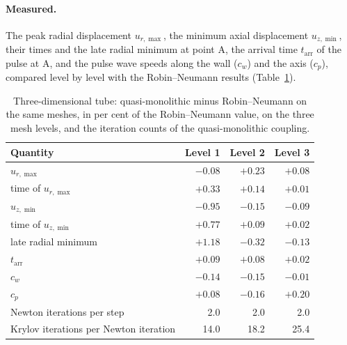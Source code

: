\paragraph{Measured.}
The peak radial displacement $u_{r,\max}$, the minimum axial displacement $u_{z,\min}$, their times and the late radial minimum at point A, the arrival time $t_\mathrm{arr}$ of the pulse at A, and the pulse wave speeds along the wall ($c_w$) and the axis ($c_p$), compared level by level with the Robin--Neumann results (Table~\ref{tab:tube3d_consistency}).

\begin{table}[htbp]
	\centering
	\caption{Three-dimensional tube: quasi-monolithic minus Robin--Neumann on the same meshes, in per cent of the Robin--Neumann value, on the three mesh levels, and the iteration counts of the quasi-monolithic coupling.}
	\label{tab:tube3d_consistency}
	\begin{tabular}{lrrr}
		\toprule
		Quantity & Level 1 & Level 2 & Level 3 \\
		\midrule
		$u_{r,\max}$ & $-0.08$ & $+0.23$ & $+0.08$ \\
		time of $u_{r,\max}$ & $+0.33$ & $+0.14$ & $+0.01$ \\
		$u_{z,\min}$ & $-0.95$ & $-0.15$ & $-0.09$ \\
		time of $u_{z,\min}$ & $+0.77$ & $+0.09$ & $+0.02$ \\
		late radial minimum & $+1.18$ & $-0.32$ & $-0.13$ \\
		$t_\mathrm{arr}$ & $+0.09$ & $+0.08$ & $+0.02$ \\
		$c_w$ & $-0.14$ & $-0.15$ & $-0.01$ \\
		$c_p$ & $+0.08$ & $-0.16$ & $+0.20$ \\
		\midrule
		Newton iterations per step & 2.0 & 2.0 & 2.0 \\
		Krylov iterations per Newton iteration & 14.0 & 18.2 & 25.4 \\
		\bottomrule
	\end{tabular}
\end{table}

